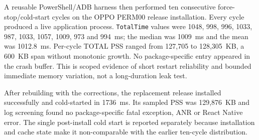 A reusable PowerShell/ADB harness then performed ten consecutive force-stop/cold-start cycles on the OPPO PERM00 release installation. Every cycle produced a live application process. \texttt{TotalTime} values were 1048, 998, 996, 1033, 987, 1033, 1057, 1009, 973 and 994~ms; the median was 1009~ms and the mean was 1012.8~ms. Per-cycle TOTAL PSS ranged from 127,705 to 128,305~KB, a 600~KB span without monotonic growth. No package-specific entry appeared in the crash buffer. This is scoped evidence of short restart reliability and bounded immediate memory variation, not a long-duration leak test.

After rebuilding with the corrections, the replacement release installed successfully and cold-started in 1736~ms. Its sampled PSS was 129,876~KB and log screening found no package-specific fatal exception, ANR or React Native error. The single post-install cold start is reported separately because installation and cache state make it non-comparable with the earlier ten-cycle distribution.
